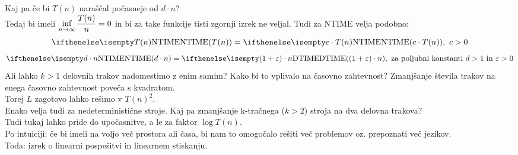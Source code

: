 \documentclass[10pt,a4paper,oneside]{book}
\begin{document}
\begin{neurejeno}
{}
Kaj pa če bi $T(n)$ naraščal počasneje od $d \cdot n$?\\
Tedaj bi imeli $\displaystyle\inf_{n\to\infty} {T(n) \over n} = 0$ %
 in bi za take funkcije tisti zgornji izrek ne veljal.%
\br
Tudi za NTIME velja podobno:
	\[ \NTIME{T(n)} = \NTIME{c\cdot T(n)},\ c>0 \]%
	\[ \NTIME{d \cdot n} = \DTIME{(1+\varepsilon)\cdot n},\mbox{ za poljubni konstanti $d>1$ in $\varepsilon>0$} \]
Ali lahko $k>1$ delovnih trakov nadomestimo z enim samim? Kako bi to vplivalo na časovno zahtevnost?
Zmanjšanje števila trakov na enega časovno zahtevnost poveča s kvadratom.\\
Torej $L$ zagotovo lahko rešimo v $T(n)^2$.\\
Enako velja tudi za nedeterministične stroje.
\br
Kaj pa zmanjšanje k-tračnega ($k>2$) stroja na dva delovna trakova?\\
Tudi tukaj lahko pride do upočasnitve, a le za faktor $\log T(n)$.\\
Po intuiciji: če bi imeli na voljo več prostora ali časa, bi nam to omogočalo rešiti več problemov oz. prepoznati več jezikov.\\
Toda: izrek o linearni pospešitvi in linearnem stiskanju.

\end{neurejeno}
\end{document}
